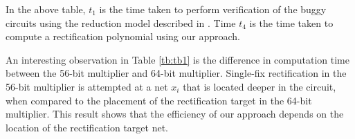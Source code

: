 In the above table, $t_1$ is the time taken to perform verification of the buggy circuits using the reduction model described in \cite{Armin2017ColumnWiseVO}. 
Time $t_4$ is the time taken to compute a rectification polynomial using our approach. 

An interesting observation in Table \ref{tb:tb1} is the difference in computation time between the 56-bit multiplier and 64-bit multiplier. Single-fix rectification in the 56-bit multiplier is attempted at a net $x_i$ that is located deeper in the circuit, when compared to the placement of the rectification target in the 64-bit multiplier. This result shows that the efficiency of our approach depends on the location of the rectification target net.
